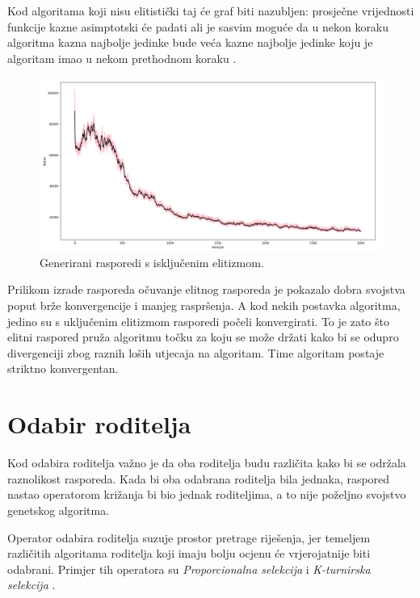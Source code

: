 \documentclass[times, utf8, zavrsni]{fer}
\begin{document}
Kod algoritama koji nisu elitistički taj će graf biti nazubljen: prosječne vrijednosti funkcije kazne asimptotski će padati ali je sasvim moguće da u nekon koraku algoritma kazna najbolje jedinke bude veća kazne najbolje jedinke koju je algoritam imao u nekom prethodnom koraku \citep{cupic-skripta}.

\begin{figure}[htb]
\centering
\includegraphics[width=14cm]{images/elitizam_ne.png}
\caption{Generirani rasporedi s isključenim elitizmom.}
\label{fig:elitiziam_da}
\end{figure}

Prilikom izrade rasporeda očuvanje elitnog rasporeda je pokazalo dobra svojstva poput brže konvergencije i manjeg raspršenja. A kod nekih postavka algoritma, jedino su s uključenim elitizmom rasporedi počeli konvergirati. To je zato što elitni raspored pruža algoritmu točku za koju se može držati kako bi se odupro divergenciji zbog raznih loših utjecaja na algoritam. Time algoritam postaje striktno konvergentan.

\section{Odabir roditelja}

Kod odabira roditelja važno je da oba roditelja budu različita kako bi se održala raznolikost rasporeda. Kada bi oba odabrana roditelja bila jednaka, raspored nastao operatorom križanja bi bio jednak roditeljima, a to nije poželjno svojstvo genetskog algoritma.

Operator odabira roditelja suzuje prostor pretrage riješenja, jer temeljem različitih algoritama roditelja koji imaju bolju ocjenu će vrjerojatnije biti odabrani. Primjer tih operatora su \emph{Proporcionalna selekcija}  i \emph{K-turnirska selekcija} .
\end{document}
